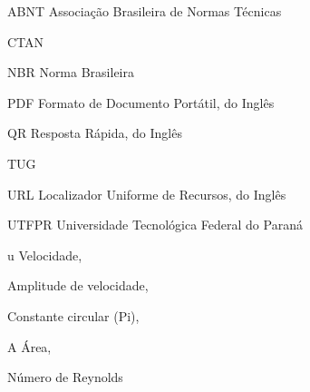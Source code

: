 

\listoffigures%

\listoftables%

\begin{AcronymsList}%
\item[ABNT] Associação Brasileira de Normas Técnicas
\item[CTAN] 
\item[NBR] Norma Brasileira
\item[PDF] Formato de Documento Portátil, do Inglês 
\item[QR] Resposta Rápida, do Inglês 
\item[TUG] 
\item[URL] Localizador Uniforme de Recursos, do Inglês 
\item[UTFPR] Universidade Tecnológica Federal do Paraná
\end{AcronymsList}

\begin{SymbolsList}%
\item[u] Velocidade, 
\item[\beta] Amplitude de velocidade, 
\item[\pi] Constante circular (Pi), 
\item[A] Área, 
\item[\mathrm{Re}] Número de Reynolds
\end{SymbolsList}

\tableofcontents%
